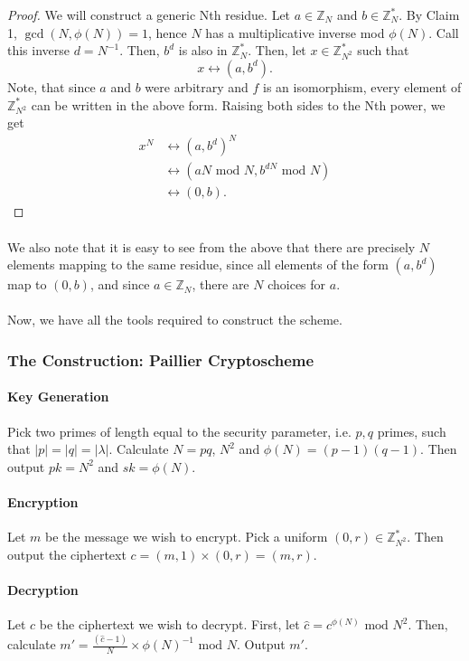 \documentclass{article}
\theoremstyle{definition}
\newcommand{\Int}{\mathbb{Z}}
\renewcommand{\mod}{\,\,\text{mod}\,\,}
\begin{document}
\begin{proof}
  We will construct a generic Nth residue. Let $a \in \Int_N$ and $b \in
  \Int_N^*$. By Claim 1, $\gcd(N, \phi(N)) = 1$, hence $N$ has a multiplicative
  inverse mod $\phi(N)$. Call this inverse $d = N^{-1}$. Then, $b^d$ is also in $\Int_N^*$. Then, let $x \in \Int_{N^2}^*$ such
  that
  \[
    x \leftrightarrow (a, b^d).
  \] 
  Note, that since $a$ and $b$ were arbitrary and $f$ is an isomorphism, every
  element of $\Int_{N^2}^*$ can be written in the above form. Raising both sides
  to the Nth power, we get
  \begin{align*}
    x^N &\leftrightarrow (a, b^d)^N \\
        &\leftrightarrow (aN \mod N, b^{dN} \mod N) \\
        &\leftrightarrow (0, b).
  \end{align*}
\end{proof}
\paragraph{} We also note that it is easy to see from the above that there are
precisely $N$ elements mapping to the same residue, since all elements of the
form $(a, b^d)$ map to $(0, b)$, and since $a\in \Int_N$, there are $N$ choices
for $a$.
\paragraph{} Now, we have all the tools required to construct the scheme.
\subsubsection{The Construction: Paillier Cryptoscheme}
\paragraph{Key Generation}
Pick two primes of length equal to the security parameter, i.e. $p, q$ primes,
such that $|p| = |q| = |\lambda|$. Calculate $N = pq$, $N^2$ and $\phi(N) = (p -
1)(q - 1)$.
Then output $pk = N^2$ and $sk = \phi(N)$.
\paragraph{Encryption}
Let $m$ be the message we wish to encrypt. Pick a uniform $(0, r) \in
\Int_{N^2}^*$. Then output the ciphertext $c = (m, 1) \times (0, r) = (m, r)$.
\paragraph{Decryption} 
Let $c$ be the ciphertext we wish to decrypt. First, let $\hat{c} = c^{\phi(N)}
\mod N^2$. Then, calculate $m' = \frac{(\hat{c} - 1)}{N} \times \phi(N)^{-1} \mod N$.
Output $m'$.
\end{document}
